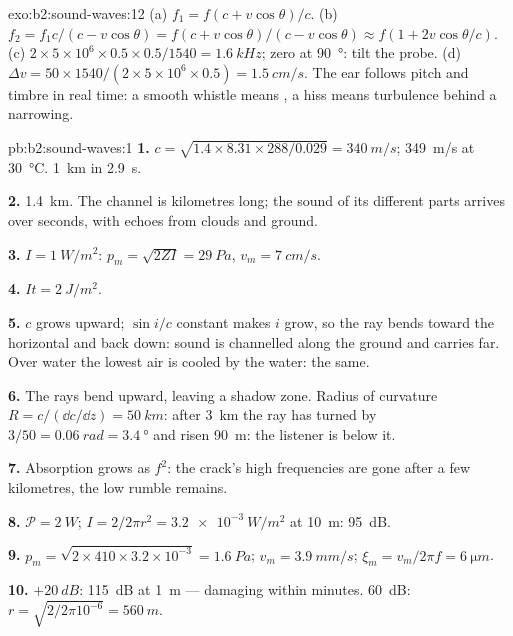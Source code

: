 \begin{solution}{exo:b2:sound-waves:12}
(a) $f_1 = f(c + v\cos\theta)/c$. (b) $f_2 = f_1c/(c - v\cos\theta) = f(c + v\cos\theta)
/(c - v\cos\theta) \approx f(1 + 2v\cos\theta/c)$. (c) $2 \times 5 \times 10^6 \times 0.5 \times 0.5/1540
= \qty{1.6}{kHz}$; zero at \qty{90}{\degree}: tilt the probe. (d) $\Delta v = 50 \times 1540/
(2 \times 5 \times 10^6 \times 0.5) = \qty{1.5}{cm/s}$. The ear follows pitch and timbre in
real time: a smooth whistle means , a hiss means turbulence
behind a narrowing.
\end{solution}

\begin{solution}{pb:b2:sound-waves:1}
\textbf{1.} $c = \sqrt{1.4 \times 8.31 \times 288/0.029} = \qty{340}{m/s}$; \qty{349}{m/s}
at \qty{30}{\degreeCelsius}. \qty{1}{km} in \qty{2.9}{s}.

\textbf{2.} \qty{1.4}{km}. The channel is kilometres long; the sound of
its different parts arrives over seconds, with echoes from clouds and
ground.

\textbf{3.} $I = \qty{1}{W/m^2}$: $p_m = \sqrt{2ZI} = \qty{29}{Pa}$, $v_m = \qty{7}{cm/s}$.

\textbf{4.} $It = \qty{2}{J/m^2}$.

\textbf{5.} $c$ grows upward; $\sin i/c$ constant makes $i$ grow, so the
ray bends toward the horizontal and back down: sound is channelled
along the ground and carries far. Over water the lowest air is cooled
by the water: the same.

\textbf{6.} The rays bend upward, leaving a shadow zone. Radius of
curvature $R = c/(\dd c/\dd z) = \qty{50}{km}$: after \qty{3}{km} the ray has
turned by $3/50 = \qty{0.06}{rad} = \qty{3.4}{\degree}$ and risen \qty{90}{m}: the
listener is below it.

\textbf{7.} Absorption grows as $f^2$: the crack's high frequencies are
gone after a few kilometres, the low rumble remains.

\textbf{8.} $\mathcal P = \qty{2}{W}$; $I = 2/2\pi r^2 = \qty{3.2e-3}{W/m^2}$ at \qty{10}{m}:
\qty{95}{dB}.

\textbf{9.} $p_m = \sqrt{2 \times 410 \times 3.2 \times 10^{-3}} = \qty{1.6}{Pa}$; $v_m = \qty{3.9}{mm/s}$;
$\xi_m = v_m/2\pi f = \qty{6}{\micro m}$.

\textbf{10.} $+\qty{20}{dB}$: \qty{115}{dB} at \qty{1}{m} --- damaging within
minutes. \qty{60}{dB}: $r = \sqrt{2/2\pi10^{-6}} = \qty{560}{m}$.


\end{solution}
